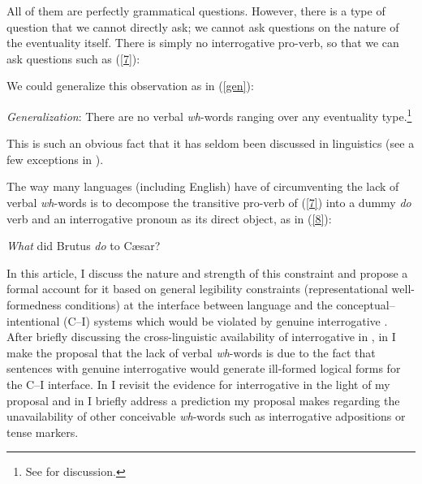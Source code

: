 \documentclass[output=paper]{langsci/langscibook}
\begin{document}
All of them are perfectly grammatical questions. However, there is a type of
question that we cannot directly ask; we cannot ask questions on the nature of
the eventuality itself. There is simply no interrogative pro-verb, so that we
can ask questions such as (\ref{7}):

\label{7}
\z

We could generalize this observation as in (\ref{gen}):

\ea
\label{gen}
\emph{Generalization}: There are no verbal \emph{wh}-words ranging over any
eventuality type.\footnote{See  for discussion.}
\z

This is such an obvious fact that it has seldom been discussed in linguistics
(see a few exceptions in
\citealt{hagege2003,hagege2008,cysouw2004,idiatov.vanderauwera2004}).

The way many languages (including English) have of circumventing the lack of
verbal \emph{wh}-words is to decompose the transitive pro-verb of (\ref{7})
into a dummy \emph{do} verb and an interrogative pronoun as its direct
object, as in (\ref{8}):\largerpage[1]

\ea
\label{8} \emph{What} did Brutus \emph{do} to C\ae{}sar?
\z

In this article, I discuss the nature and strength of this constraint and
propose a formal account for it based on general legibility constraints
(representational well-formedness conditions) at the interface between language
and the conceptual--intentional (C--I) systems which would be violated by genuine
interrogative . After briefly discussing the cross-linguistic
availability of interrogative  in , in  I make
the proposal that the lack of verbal \emph{wh}-words is due to the fact that
sentences with genuine interrogative  would generate ill-formed
logical forms for the C--I interface. In  I revisit the
evidence for interrogative  in the light of my proposal and in
 I briefly address a prediction my proposal makes
regarding the unavailability of other conceivable \emph{wh}-words such as
interrogative adpositions or tense markers.\largerpage[-1]
\end{document}
